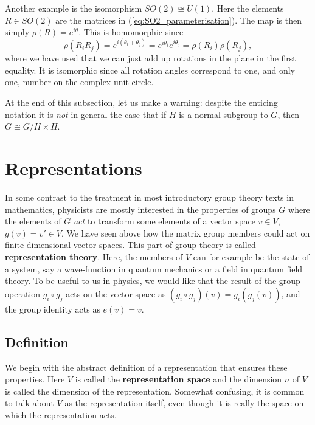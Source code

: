 \documentclass[notes.tex]{subfiles}
\begin{document}
Another example is the isomorphism $SO(2)\cong U(1)$. Here the elements $R\in SO(2)$ are the matrices in (\ref{eq:SO2_parameterisation}). The map is then simply $\rho(R)= e^{i\theta}$. This is homomorphic since
\[ \rho(R_iR_j)= e^{i(\theta_i+\theta_j)}= e^{i\theta_i} e^{i\theta_j} =\rho(R_i)\rho(R_j), \]
where we have used that we can just add up rotations in the plane in the first equality. It is isomorphic since all rotation angles correspond to one, and only one, number on the complex unit circle.

At the end of this subsection, let us make a warning: despite the enticing notation it is {\it not} in general the case that if $H$ is a normal subgroup to $G$, then $G\cong G/H\times H$.


\section{Representations}
\label{sec:rep}
In some contrast to the treatment in most introductory group theory texts in mathematics, physicists are mostly interested in the properties of groups $G$ where the elements of $G$ {\it act} to transform some elements of a vector space $v\in V$, $g(v) = v' \in V$. We have seen above how the matrix group members could act on finite-dimensional vector spaces.  This part of group theory is called {\bf representation theory}. Here, the members of $V$ can for example be the state of a system, say a wave-function in quantum mechanics or a field in quantum field theory. 
To be useful to us in physics, we would like that the result of the group operation $g_i \circ g_j$ acts on the vector space as $(g_i\circ g_j)(v) = g_i(g_j(v))$, and the group identity acts as $e(v) = v$.


\subsection{Definition}
We begin with the abstract definition of a representation that ensures these properties. 
Here $V$ is called the {\bf representation space} and the dimension $n$ of $V$ is called the dimension of the representation. Somewhat confusing, it is common to talk about $V$ as the representation itself, even though it is really the space on which the representation acts. 
\end{document}

